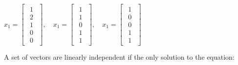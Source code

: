 \begin{math}
    x_1 = \begin{bmatrix}
        \begin{array}{c}
            1 \\
            2 \\
            1 \\
            0 \\
            0
        \end{array}
    \end{bmatrix},\quad
    x_1 = \begin{bmatrix}
        \begin{array}{c}
            1 \\
            1 \\
            0 \\
            1 \\
            1
        \end{array}
    \end{bmatrix},\quad
    x_1 = \begin{bmatrix}
        \begin{array}{c}
            1 \\
            0 \\
            0 \\
            1 \\
            1
        \end{array}
    \end{bmatrix}
\end{math}

\singlespacing
\singlespacing

A set of vectors are linearly independent if the only solution to the equation:

\singlespacing
\singlespacing

